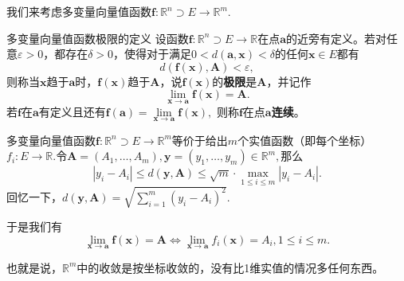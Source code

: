 \begin{frame}

我们来考虑多变量向量值函数$\mathbf{f}:\mathbb{R}^n \supset E \to \mathbb{R}^m.$

\pause

\begin{block}{多变量向量值函数极限的定义}
设函数$\mathbf{f}: \mathbb{R}^n \supset E \to \mathbb{R}$在点$\mathbf{a}$的近旁有定义。若对任意$\varepsilon > 0$，都存在$\delta > 0$，使得对于满足$0 < d(\mathbf{a}, \mathbf{x}) < \delta$的任何$\mathbf{x}\in E$都有
$$d(\mathbf{f}(\mathbf{x}), \mathbf{A}) < \varepsilon,$$
则称当$\mathbf{x}$趋于$\mathbf{a}$时，$\mathbf{f}(\mathbf{x})$趋于$\mathbf{A}$，说$\mathbf{f}(\mathbf{x})$的{\bfseries 极限}是$\mathbf{A}$，并记作
$$\lim\limits_{\mathbf{x}\to \mathbf{a}}\mathbf{f}(\mathbf{x}) = \mathbf{A}.$$
若$\mathbf{f}$在$\mathbf{a}$有定义且还有$\mathbf{f}(\mathbf{a}) = \lim\limits_{\mathbf{x} \to \mathbf{a}} \mathbf{f}(\mathbf{x}),$ 则称$\mathbf{f}$在点$\mathbf{a}${\bfseries 连续}。
\end{block}

\end{frame}


\begin{frame}

多变量向量值函数$\mathbf{f}:\mathbb{R}^n \supset E \to \mathbb{R}^m$等价于给出$m$个实值函数（即每个坐标）$f_i: E \to \mathbb{R}.$令$\mathbf{A} = (A_1,\ldots,A_m), \mathbf{y} = (y_1,\ldots,y_m) \in \mathbb{R}^m,$那么
$$|y_i - A_i| \leqslant d(\mathbf{y}, \mathbf{A}) \leqslant \sqrt{m}\cdot \max\limits_{1\leqslant i \leqslant m} |y_i - A_i|.$$
回忆一下，\(\displaystyle d(\mathbf{y}, \mathbf{A}) = \sqrt{\sum\limits_{i=1}^m (y_i - A_i)^2}.\)

\pause

于是我们有
$$\lim\limits_{\mathbf{x}\to\mathbf{a}} \mathbf{f}(\mathbf{x}) = \mathbf{A} \Longleftrightarrow \lim\limits_{\mathbf{x}\to\mathbf{a}} f_i(\mathbf{x}) = A_i, 1\leqslant i \leqslant m.$$

\pause

也就是说，$\mathbb{R}^m$中的收敛是按坐标收敛的，没有比1维实值的情况多任何东西。

\end{frame}



